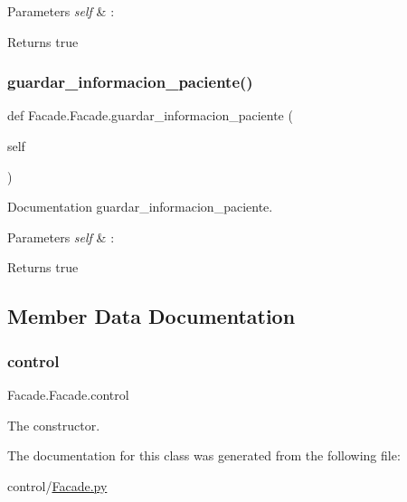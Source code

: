 \begin{DoxyParams}{Parameters}
{\em self} & \+: \\
\hline
\end{DoxyParams}
\begin{DoxyReturn}{Returns}
true 
\end{DoxyReturn}
\mbox{\label{class_facade_1_1_facade_a2d6ce899835aaae1a3b6022444d7127a}} 
\subsubsection{\texorpdfstring{guardar\+\_\+informacion\+\_\+paciente()}{guardar\_informacion\_paciente()}}
{\footnotesize\ttfamily def Facade.\+Facade.\+guardar\+\_\+informacion\+\_\+paciente (\begin{DoxyParamCaption}\item[{}]{self }\end{DoxyParamCaption})}



Documentation guardar\+\_\+informacion\+\_\+paciente. 


\begin{DoxyParams}{Parameters}
{\em self} & \+: \\
\hline
\end{DoxyParams}
\begin{DoxyReturn}{Returns}
true 
\end{DoxyReturn}


\subsection{Member Data Documentation}
\mbox{\label{class_facade_1_1_facade_a4ec08f6f7094ff267875a3abc6f0cb1b}} 
\subsubsection{\texorpdfstring{control}{control}}
{\footnotesize\ttfamily Facade.\+Facade.\+control}



The constructor. 



The documentation for this class was generated from the following file\+:\begin{DoxyCompactItemize}
\item 
control/\mbox{\hyperlink{_facade_8py}{Facade.\+py}}\end{DoxyCompactItemize}
